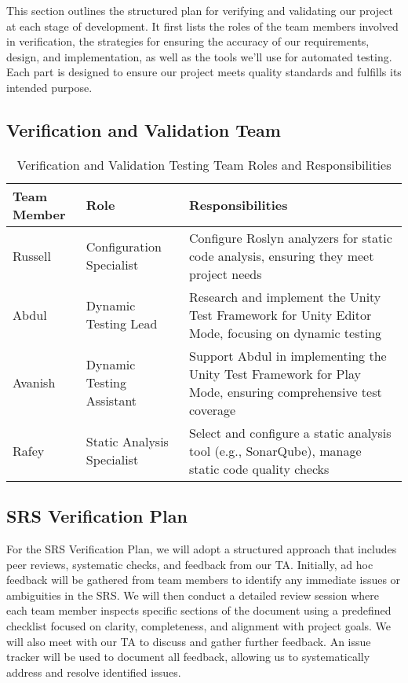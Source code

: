\documentclass[12pt, titlepage]{article}
\begin{document}
This section outlines the structured plan for verifying and validating our project at each stage of development. It first lists the roles of the team members involved in verification, the strategies for ensuring the accuracy of our requirements, design, and implementation, as well as the tools we'll use for automated testing. Each part is designed to ensure our project meets quality standards and fulfills its intended purpose.

\subsection{Verification and Validation Team}

\begin{table}[h!]
  \centering
  \begin{tabularx}{\textwidth}{|l|l|X|}
    \hline
    \textbf{Team Member} & \textbf{Role}              & \textbf{Responsibilities}                                                                                  \\ \hline
    Russell              & Configuration Specialist   & Configure Roslyn analyzers for static code analysis, ensuring they meet project needs                      \\ \hline
    Abdul                & Dynamic Testing Lead       & Research and implement the Unity Test Framework for Unity Editor Mode, focusing on dynamic testing         \\ \hline
    Avanish              & Dynamic Testing Assistant  & Support Abdul in implementing the Unity Test Framework for Play Mode, ensuring comprehensive test coverage \\ \hline
    Rafey                & Static Analysis Specialist & Select and configure a static analysis tool (e.g., SonarQube), manage static code quality checks           \\ \hline
  \end{tabularx}
  \caption{Verification and Validation Testing Team Roles and Responsibilities}
\end{table}

\subsection{SRS Verification Plan}

For the SRS Verification Plan, we will adopt a structured approach that includes peer reviews, systematic checks, and feedback from our TA. Initially, ad hoc feedback will be gathered from team members to identify any immediate issues or ambiguities in the SRS. We will then conduct a detailed review session where each team member inspects specific sections of the document using a predefined checklist focused on clarity, completeness, and alignment with project goals. We will also meet with our TA to discuss and gather further feedback. An issue tracker will be used to document all feedback, allowing us to systematically address and resolve identified issues.
\end{document}
